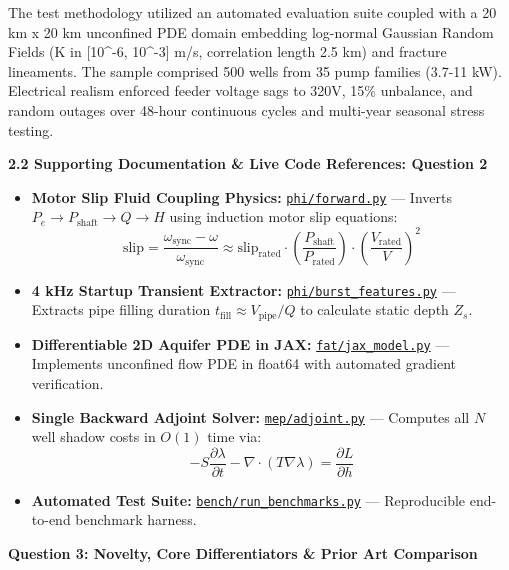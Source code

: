 \documentclass[10pt,a4paper]{article}
\begin{document}
The test methodology utilized an automated evaluation suite coupled with a 20 km x 20 km unconfined PDE domain embedding log-normal Gaussian Random Fields (K in [10\^{}-6, 10\^{}-3] m/s, correlation length 2.5 km) and fracture lineaments. The sample comprised 500 wells from 35 pump families (3.7-11 kW). Electrical realism enforced feeder voltage sags to 320V, 15\% unbalance, and random outages over 48-hour continuous cycles and multi-year seasonal stress testing.

{\small \textbf{\color{secondary}2.2 Supporting Documentation \& Live Code References: Question 2}}
\begin{itemize}[leftmargin=1.5em, itemsep=1pt]
    \item \textbf{Motor Slip Fluid Coupling Physics:} \href{https://github.com/HirthikBalaji/AquiPulse/blob/main/phi/forward.py}{\texttt{phi/forward.py}} --- Inverts $P_e \to P_{\text{shaft}} \to Q \to H$ using induction motor slip equations:
    $$\text{slip} = \frac{\omega_{\text{sync}} - \omega}{\omega_{\text{sync}}} \approx \text{slip}_{\text{rated}} \cdot \left(\frac{P_{\text{shaft}}}{P_{\text{rated}}}\right) \cdot \left(\frac{V_{\text{rated}}}{V}\right)^2$$
    \item \textbf{4 kHz Startup Transient Extractor:} \href{https://github.com/HirthikBalaji/AquiPulse/blob/main/phi/burst_features.py}{\texttt{phi/burst\_features.py}} --- Extracts pipe filling duration $t_{\text{fill}} \approx V_{\text{pipe}}/Q$ to calculate static depth $Z_s$.
    \item \textbf{Differentiable 2D Aquifer PDE in JAX:} \href{https://github.com/HirthikBalaji/AquiPulse/blob/main/fat/jax_model.py}{\texttt{fat/jax\_model.py}} --- Implements unconfined flow PDE in float64 with automated gradient verification.
    \item \textbf{Single Backward Adjoint Solver:} \href{https://github.com/HirthikBalaji/AquiPulse/blob/main/mep/adjoint.py}{\texttt{mep/adjoint.py}} --- Computes all $N$ well shadow costs in $O(1)$ time via:
    $$-S \frac{\partial \lambda}{\partial t} - \nabla \cdot (T \nabla \lambda) = \frac{\partial L}{\partial h}$$
    \item \textbf{Automated Test Suite:} \href{https://github.com/HirthikBalaji/AquiPulse/blob/main/bench/run_benchmarks.py}{\texttt{bench/run\_benchmarks.py}} --- Reproducible end-to-end benchmark harness.
\end{itemize}

\newpage

{\large \textbf{\color{primary}Question 3: Novelty, Core Differentiators \& Prior Art Comparison}}
\vspace{0.1em}
\end{document}
